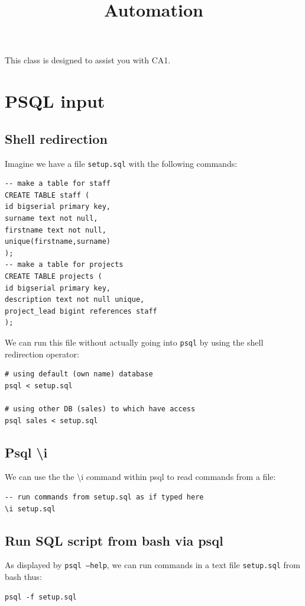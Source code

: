 \documentclass{pgnotes}
\title{Automation}
\begin{document}
\maketitle

This class is designed to assist you with CA1.

\section{PSQL input}

\subsection{Shell redirection}

Imagine we have a file \texttt{setup.sql} with the following commands:
\begin{verbatim}
-- make a table for staff
CREATE TABLE staff ( 
id bigserial primary key,
surname text not null,
firstname text not null,
unique(firstname,surname)
);
-- make a table for projects
CREATE TABLE projects ( 
id bigserial primary key,
description text not null unique,
project_lead bigint references staff
);
\end{verbatim}

We can run this file without actually going into \texttt{psql} by using the shell redirection operator:

\begin{verbatim}
# using default (own name) database
psql < setup.sql

# using other DB (sales) to which have access
psql sales < setup.sql
\end{verbatim}

\subsection{Psql \textbackslash i}

We can use the the \textbackslash i command within psql to read commands from a file:
\begin{verbatim}
-- run commands from setup.sql as if typed here
\i setup.sql
\end{verbatim}

\subsection{Run SQL script from bash via psql}

As displayed by \texttt{psql --help}, we can run commands in a text file \texttt{setup.sql} from bash thus:
\begin{verbatim}
psql -f setup.sql 
\end{verbatim}
\end{document}
